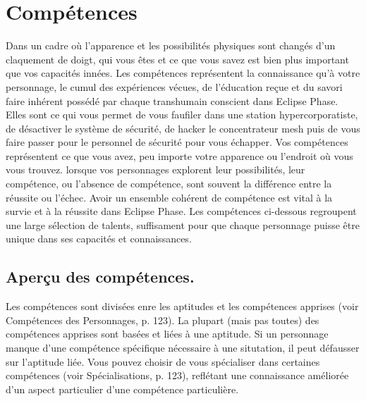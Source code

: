 \chapter{Compétences} \label{chap:skills} 

Dans un cadre où l'apparence et les possibilités physiques sont changés d'un claquement de doigt, qui vous êtes et ce que vous savez est bien plus important que vos capacités innées. Les compétences représentent la connaissance qu'à votre personnage, le cumul des expériences vécues, de l'éducation reçue et du savori faire inhérent possédé par chaque transhumain conscient dans Eclipse Phase. Elles sont ce qui vous permet de vous faufiler dans une station hypercorporatiste, de désactiver le système de sécurité, de hacker le concentrateur mesh puis de vous faire passer pour le personnel de sécurité pour vous échapper. Vos compétences représentent ce que vous avez, peu importe votre apparence ou l'endroit où vous vous trouvez. lorsque vos personnages explorent leur possibilités, leur compétence, ou l'absence de compétence, sont souvent la différence entre la réussite ou l'échec. Avoir un ensemble cohérent de compétence est vital à la survie et à la réussite dans Eclipse Phase. Les compétences ci-dessous regroupent une large sélection de talents, suffisament pour que chaque personnage puisse être unique dans ses capacités et connaissances. 

\section{Aperçu des compétences.} Les compétences sont divisées enre les aptitudes et les compétences apprises (voir Compétences des Personnages, p. 123). La plupart (mais pas toutes) des compétences apprises sont basées et liées à une aptitude. Si un personnage manque d'une compétence spécifique nécessaire à une situtation, il peut défausser sur l'aptitude liée. Vous pouvez choisir de vous spécialiser dans certaines compétences (voir Spécialisations, p. 123), reflétant une connaissance améliorée d'un aspect particulier d'une compétence particulière. 

